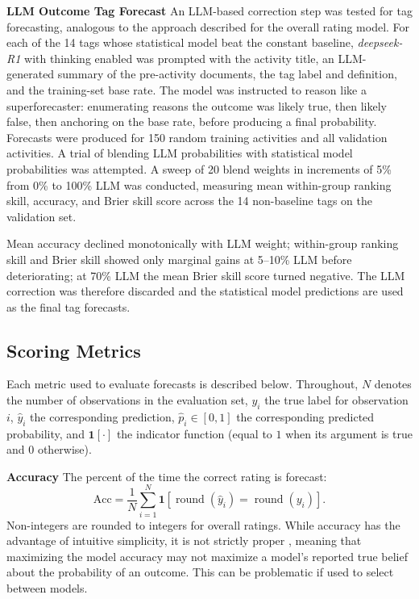 \documentclass[12pt,a4paper]{article}
\let\citep\parencite
\begin{document}
\textbf{LLM Outcome Tag Forecast}
An LLM-based correction step was tested for tag forecasting, analogous to the approach described for the overall rating model. For each of the 14 tags whose statistical model beat the constant baseline, \emph{deepseek-R1} with thinking enabled was prompted with the activity title, an LLM-generated summary of the pre-activity documents, the tag label and definition, and the training-set base rate. The model was instructed to reason like a superforecaster: enumerating reasons the outcome was likely true, then likely false, then anchoring on the base rate, before producing a final probability. Forecasts were produced for 150 random training activities and all validation activities. A trial of blending LLM probabilities with statistical model probabilities was attempted. A sweep of 20 blend weights in increments of 5\% from 0\% to 100\% LLM was conducted, measuring mean within-group ranking skill, accuracy, and Brier skill score across the 14 non-baseline tags on the validation set.

Mean accuracy declined monotonically with LLM weight; within-group ranking skill and Brier skill showed only marginal gains at 5--10\% LLM before deteriorating; at 70\% LLM the mean Brier skill score turned negative. The LLM correction was therefore discarded and the statistical model predictions are used as the final tag forecasts.



\subsection{Scoring Metrics} \label{sub:scoringmetrics}

Each metric used to evaluate forecasts is described below. Throughout, $N$ denotes the number of observations in the evaluation set, $y_i$ the true label for observation $i$, $\hat{y}_i$ the corresponding prediction, $\hat{p}_i \in [0,1]$ the corresponding predicted probability, and $\mathbf{1}[\cdot]$ the indicator function (equal to $1$ when its argument is true and $0$ otherwise).

\textbf{Accuracy}
The percent of the time the correct rating is forecast:
\[
  \mathrm{Acc} = \frac{1}{N}\sum_{i=1}^{N} \mathbf{1}[\operatorname{round}(\hat{y}_i) = \operatorname{round}(y_i)].
\]
Non-integers are rounded to integers for overall ratings. While accuracy has the advantage of intuitive simplicity, it is not strictly proper \citep{gneitingStrictlyProperScoring2007}, meaning that maximizing the model accuracy may not maximize a model's reported true belief about the probability of an outcome. This can be problematic if used to select between models.
\end{document}
